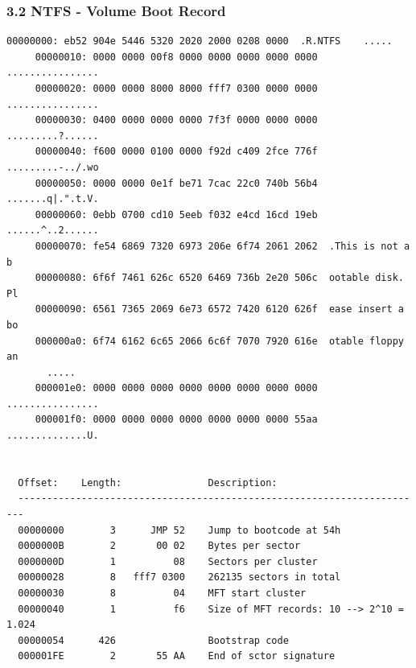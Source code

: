 \begin{frame}[fragile]
  \frametitle{3.2 NTFS - Volume Boot Record}
  \begin{lstlisting}[basicstyle=\tiny]
     00000000: eb52 904e 5446 5320 2020 2000 0208 0000  .R.NTFS    .....
     00000010: 0000 0000 00f8 0000 0000 0000 0000 0000  ................
     00000020: 0000 0000 8000 8000 fff7 0300 0000 0000  ................
     00000030: 0400 0000 0000 0000 7f3f 0000 0000 0000  .........?......
     00000040: f600 0000 0100 0000 f92d c409 2fce 776f  .........-../.wo
     00000050: 0000 0000 0e1f be71 7cac 22c0 740b 56b4  .......q|.".t.V.
     00000060: 0ebb 0700 cd10 5eeb f032 e4cd 16cd 19eb  ......^..2......
     00000070: fe54 6869 7320 6973 206e 6f74 2061 2062  .This is not a b
     00000080: 6f6f 7461 626c 6520 6469 736b 2e20 506c  ootable disk. Pl
     00000090: 6561 7365 2069 6e73 6572 7420 6120 626f  ease insert a bo
     000000a0: 6f74 6162 6c65 2066 6c6f 7070 7920 616e  otable floppy an
       .....
     000001e0: 0000 0000 0000 0000 0000 0000 0000 0000  ................
     000001f0: 0000 0000 0000 0000 0000 0000 0000 55aa  ..............U.


  Offset:    Length:               Description:
  -----------------------------------------------------------------------
  00000000        3      JMP 52    Jump to bootcode at 54h
  0000000B        2       00 02    Bytes per sector
  0000000D        1          08    Sectors per cluster
  00000028        8   fff7 0300    262135 sectors in total
  00000030        8          04    MFT start cluster
  00000040        1          f6    Size of MFT records: 10 --> 2^10 = 1.024
  00000054      426                Bootstrap code
  000001FE        2       55 AA    End of sctor signature
  \end{lstlisting}
\end{frame}



